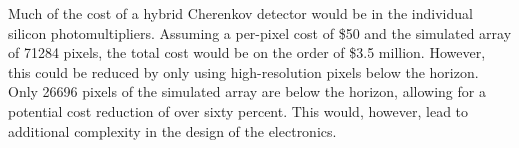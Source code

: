 Much of the cost of a hybrid Cherenkov detector would be in the individual silicon photomultipliers. Assuming a per-pixel cost of \$50 and the simulated array of \num{71284} pixels, the total cost would be on the order of \$3.5 million. However, this could be reduced by only using high-resolution pixels below the horizon. Only \num{26696} pixels of the simulated array are below the horizon, allowing for a potential cost reduction of over sixty percent. This would, however, lead to additional complexity in the design of the electronics.